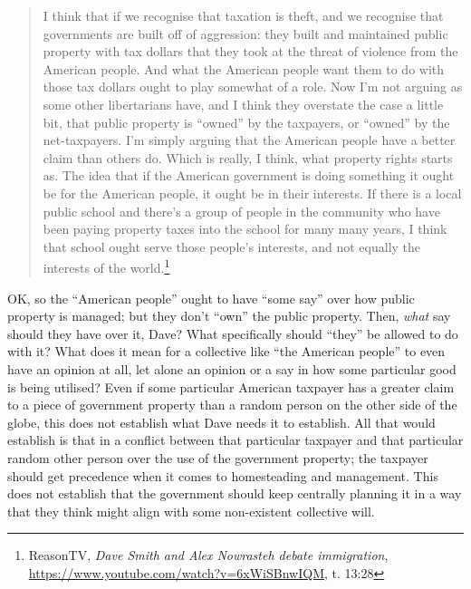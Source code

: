 \documentclass[11pt]{article}
\begin{document}
\begin{quote}
I think that if we recognise that taxation is theft, and we recognise that governments are built off of aggression: they built and maintained public property with tax dollars that they took at the threat of violence from the American people. And what the American people want them to do with those tax dollars ought to play somewhat of a role. Now I'm not arguing as some other libertarians have, and I think they overstate the case a little bit, that public property is ``owned'' by the taxpayers, or ``owned'' by the net-taxpayers. I'm simply arguing that the American people have a better claim than others do. Which is really, I think, what property rights starts as. The idea that if the American government is doing something it ought be for the American people, it ought be in their interests. If there is a local public school and there's a group of people in the community who have been paying property taxes into the school for many many years, I think that school ought serve those people's interests, and not equally the interests of the world.\footnote{ReasonTV, \emph{Dave Smith and Alex Nowrasteh debate immigration}, \url{https://www.youtube.com/watch?v=6xWiSBnwIQM}, t. 13:28}
\end{quote}

OK, so the ``American people'' ought to have ``some say'' over how public property is managed; but they don't ``own'' the public property. Then, \emph{what} say should they have over it, Dave? What specifically should ``they'' be allowed to do with it? What does it mean for a collective like ``the American people'' to even have an opinion at all, let alone an opinion or a say in how some particular good is being utilised? Even if some particular American taxpayer has a greater claim to a piece of government property than a random person on the other side of the globe, this does not establish what Dave needs it to establish. All that would establish is that in a conflict between that particular taxpayer and that particular random other person over the use of the government property; the taxpayer should get precedence when it comes to homesteading and management. This does not establish that the government should keep centrally planning it in a way that they think might align with some non-existent collective will.
\end{document}
